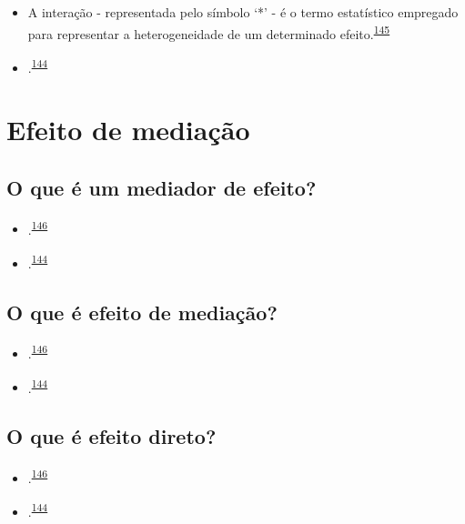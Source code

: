 \documentclass[
  a4paper,
]{book}
\begin{document}
\begin{itemize}
\item
  A interação - representada pelo símbolo `*' - é o termo estatístico empregado para representar a heterogeneidade de um determinado efeito.\textsuperscript{\protect\hyperlink{ref-Altman1996}{145}}
\item
  .\textsuperscript{\protect\hyperlink{ref-Bours2023}{144}}
\end{itemize}

\hypertarget{mediacao}{%
\section{Efeito de mediação}\label{mediacao}}

\hypertarget{o-que-uxe9-um-mediador-de-efeito}{%
\subsection{O que é um mediador de efeito?}\label{o-que-uxe9-um-mediador-de-efeito}}

\begin{itemize}
\item
  .\textsuperscript{\protect\hyperlink{ref-Baron1986}{146}}
\item
  .\textsuperscript{\protect\hyperlink{ref-Bours2023}{144}}
\end{itemize}

\hypertarget{o-que-uxe9-efeito-de-mediauxe7uxe3o}{%
\subsection{O que é efeito de mediação?}\label{o-que-uxe9-efeito-de-mediauxe7uxe3o}}

\begin{itemize}
\item
  .\textsuperscript{\protect\hyperlink{ref-Baron1986}{146}}
\item
  .\textsuperscript{\protect\hyperlink{ref-Bours2023}{144}}
\end{itemize}

\hypertarget{o-que-uxe9-efeito-direto}{%
\subsection{O que é efeito direto?}\label{o-que-uxe9-efeito-direto}}

\begin{itemize}
\item
  .\textsuperscript{\protect\hyperlink{ref-Baron1986}{146}}
\item
  .\textsuperscript{\protect\hyperlink{ref-Bours2023}{144}}
\end{itemize}
\end{document}
